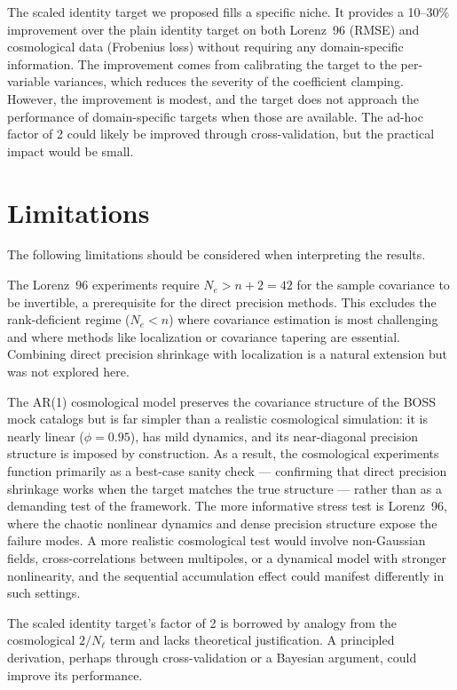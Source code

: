 The scaled identity target we proposed fills a specific niche. It provides a 10--30\% improvement over the plain identity target on both Lorenz~96 (RMSE) and cosmological data (Frobenius loss) without requiring any domain-specific information. The improvement comes from calibrating the target to the per-variable variances, which reduces the severity of the coefficient clamping. However, the improvement is modest, and the target does not approach the performance of domain-specific targets when those are available. The ad-hoc factor of 2 could likely be improved through cross-validation, but the practical impact would be small.

\section{Limitations}

The following limitations should be considered when interpreting the results.

The Lorenz~96 experiments require $N_e > n + 2 = 42$ for the sample covariance to be invertible, a prerequisite for the direct precision methods. This excludes the rank-deficient regime ($N_e < n$) where covariance estimation is most challenging and where methods like localization or covariance tapering are essential. Combining direct precision shrinkage with localization is a natural extension but was not explored here.

The AR(1) cosmological model preserves the covariance structure of the BOSS mock catalogs but is far simpler than a realistic cosmological simulation: it is nearly linear ($\phi = 0.95$), has mild dynamics, and its near-diagonal precision structure is imposed by construction. As a result, the cosmological experiments function primarily as a best-case sanity check --- confirming that direct precision shrinkage works when the target matches the true structure --- rather than as a demanding test of the framework. The more informative stress test is Lorenz~96, where the chaotic nonlinear dynamics and dense precision structure expose the failure modes. A more realistic cosmological test would involve non-Gaussian fields, cross-correlations between multipoles, or a dynamical model with stronger nonlinearity, and the sequential accumulation effect could manifest differently in such settings.

The scaled identity target's factor of 2 is borrowed by analogy from the cosmological $2/N_\ell$ term and lacks theoretical justification. A principled derivation, perhaps through cross-validation or a Bayesian argument, could improve its performance.


